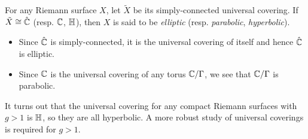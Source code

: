 \documentclass[../Moduli_Spaces_of_Riemann_Surfaces.tex]{subfiles}
\begin{document}
    \begin{remark}
        For any Riemann surface $X$, let $\tilde{X}$ be its simply-connected universal covering. If $\tilde{X}\cong\hat{\mathbb{C}}$ (resp. $\mathbb{C}$, $\mathbb{H}$), then $X$ is said to be \textit{elliptic} (resp. \textit{parabolic}, \textit{hyperbolic}).
        \begin{itemize}
            \item Since $\hat{\mathbb{C}}$ is simply-connected, it is the universal covering of itself and hence $\hat{\mathbb{C}}$ is elliptic.
            \item Since $\mathbb{C}$ is the universal covering of any torus $\mathbb{C}/\Gamma$, we see that $\mathbb{C}/\Gamma$ is parabolic.
        \end{itemize}
        It turns out that the universal covering for any compact Riemann surfaces with $g>1$ is $\mathbb{H}$, so they are all hyperbolic. A more robust study of universal coverings is required for $g>1$.\exqed
    \end{remark}
\end{document}

